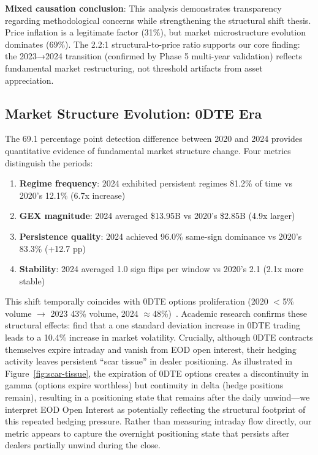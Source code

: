 \vspace{0.2cm}

\noindent\textbf{Mixed causation conclusion}: This analysis demonstrates transparency regarding methodological concerns while strengthening the structural shift thesis. Price inflation is a legitimate factor (31\%), but market microstructure evolution dominates (69\%). The 2.2:1 structural-to-price ratio supports our core finding: the 2023→2024 transition (confirmed by Phase 5 multi-year validation) reflects fundamental market restructuring, not threshold artifacts from asset appreciation.

\subsection{Market Structure Evolution: 0DTE Era}

\vspace{0.2cm}

The 69.1 percentage point detection difference between 2020 and 2024 provides quantitative evidence of fundamental market structure change. Four metrics distinguish the periods:

\vspace{0.1cm}

\begin{enumerate}
\item \textbf{Regime frequency}: 2024 exhibited persistent regimes 81.2\% of time vs 2020's 12.1\% (6.7x increase)
\item \textbf{GEX magnitude}: 2024 averaged \$13.95B vs 2020's \$2.85B (4.9x larger)
\item \textbf{Persistence quality}: 2024 achieved 96.0\% same-sign dominance vs 2020's 83.3\% (+12.7 pp)
\item \textbf{Stability}: 2024 averaged 1.0 sign flips per window vs 2020's 2.1 (2.1x more stable)
\end{enumerate}

\vspace{0.2cm}

This shift temporally coincides with 0DTE options proliferation (2020 $<$5\% volume $\rightarrow$ 2023 43\% volume, 2024 $\approx$48\%)~\citep{cboe2024zero}. Academic research confirms these structural effects: \citet{brogaard2023does} find that a one standard deviation increase in 0DTE trading leads to a 10.4\% increase in market volatility. Crucially, although 0DTE contracts themselves expire intraday and vanish from EOD open interest, their hedging activity leaves persistent ``scar tissue'' in dealer positioning. As illustrated in Figure~\ref{fig:scar-tissue}, the expiration of 0DTE options creates a discontinuity in gamma (options expire worthless) but continuity in delta (hedge positions remain), resulting in a positioning state that remains after the daily unwind---we interpret EOD Open Interest as potentially reflecting the structural footprint of this repeated hedging pressure. Rather than measuring intraday flow directly, our metric appears to capture the overnight positioning state that persists after dealers partially unwind during the close.

